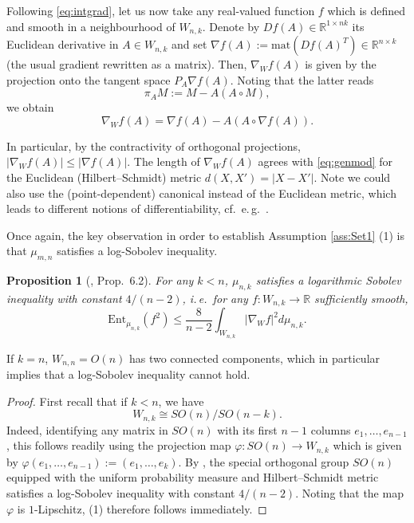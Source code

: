 \documentclass[a4paper,12pt]{amsart}
\numberwithin{equation}{section}
\newtheorem{proposition}[satz]{Proposition}
\theoremstyle{remark}
\def\cs{\circ}
\begin{document}
Following \eqref{eq:intgrad}, let us now take any real-valued function $f$ which is defined and smooth in a neighbourhood of $W_{n,k}$. Denote by $Df(A) \in \mathbb{R}^{1 \times nk}$ its Euclidean derivative in $A \in W_{n,k}$ and set $\nabla f(A) := \mathrm{mat}(Df(A)^T) \in \mathbb{R}^{n \times k}$ (the usual gradient rewritten as a matrix). Then, $\nabla_W f(A)$ is given by the projection onto the tangent space $P_A \nabla f(A)$. Noting that the latter reads
\begin{equation}\label{eq:projfSt}
	\pi_AM := M - A(A \cs M),
\end{equation}
we obtain
\begin{equation}\label{eq:FormelStiefelGradient}
	\nabla_W f(A) = \nabla f(A) - A(A\cs \nabla f(A)).
\end{equation}

In particular, by the contractivity of orthogonal projections, $|\nabla_W f(A)| \leq |\nabla f(A)|$. The length of $\nabla_W f(A)$ agrees with \eqref{eq:genmod} for the Euclidean (Hilbert--Schmidt) metric $d(X,X') = |X-X'|$. Note we could also use the (point-dependent) canonical instead of the Euclidean metric, which leads to different notions of differentiability, cf.\ e.\,g.\ \cite{EAS98}.

Once again, the key observation in order to establish Assumption \ref{ass:Set1} (1) is that $\mu_{m,n}$ satisfies a log-Sobolev inequality.

\begin{proposition}[\cite{GS23}, Prop.\ 6.2]\label{prop:LSUSt}
	For any $k < n$, $\mu_{n,k}$ satisfies a logarithmic Sobolev inequality with constant $4/(n-2)$, i.\,e.\ for any $f \colon W_{n,k} \to \mathbb{R}$ sufficiently smooth,
		\[
		\mathrm{Ent}_{\mu_{n,k}} (f^2) \le \frac{8}{n-2} \int_{W_{n,k}} |\nabla_W f|^2 d\mu_{n,k}.
		\]
\end{proposition}

If $k=n$, $W_{n,n} = O(n)$ has two connected components, which in particular implies that a log-Sobolev inequality cannot hold.

\begin{proof}
	First recall that if $k < n$, we have
	\[
	W_{n,k} \cong SO(n)/SO(n-k).
	\]
	Indeed, identifying any matrix in $SO(n)$ with its first $n-1$ columns $e_1, \ldots, e_{n-1}$, this follows readily using the projection map $\varphi \colon SO(n) \to W_{n,k}$ which is given by $\varphi(e_1, \ldots, e_{n-1}) := (e_1, \ldots, e_k)$. By \cite[Th.\ 5.16]{Mec19}, the special orthogonal group $SO(n)$ equipped with the uniform probability measure and Hilbert--Schmidt metric satisfies a log-Sobolev inequality with constant $4/(n-2)$. Noting that the map $\varphi$ is $1$-Lipschitz, (1) therefore follows immediately.
\end{proof}
\end{document}
